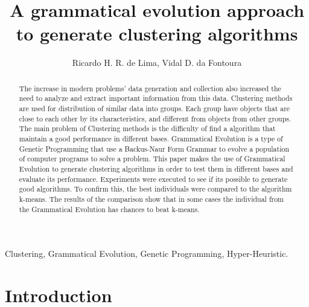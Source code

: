 \documentclass[journal]{IEEEtran}
\begin{document}
%

\title{A grammatical evolution approach to generate clustering algorithms}


\author{
	Ricardo H. R. de Lima,
	Vidal D. da Fontoura}


\maketitle

\begin{abstract}

The increase in modern problems' data generation and collection also increased the need to analyze and extract important information from this data. Clustering methods are used for distribution of similar data into groups. Each group have objects that are close to each other by its characteristics, and different from objects from other groups. The main problem of Clustering methods is the difficulty of find a algorithm that maintain a good performance in different bases. Grammatical Evolution is a type of Genetic Programming that use a Backus-Naur Form Grammar to evolve a population of computer programs to solve a problem. This paper makes the use of Grammatical Evolution to generate clustering algorithms in order to test them in different bases and evaluate its performance. Experiments were executed to see if its possible to generate good algorithms. To confirm this, the best individuals were compared to the algorithm k-means. The results of the comparison show that in some cases the individual from the Grammatical Evolution has chances to beat k-means.

\end{abstract}

\begin{IEEEkeywords}
	Clustering, Grammatical Evolution, Genetic Programming, Hyper-Heuristic.
\end{IEEEkeywords}

\IEEEpeerreviewmaketitle

\section{Introduction}
\end{document}
